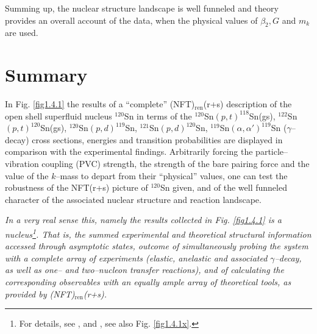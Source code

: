   
  Summing up, the nuclear structure landscape is well funneled and  theory provides an overall account of the data, when the physical values of $\beta_2,G$ and $m_k$ are used.

\section{Summary}\label{C1S11}
In Fig. \ref{fig1.4.1} the results of a ``complete'' (NFT)$_{\text{ren}}$(r+s) description of the open shell superfluid nucleus $^{120}$Sn in terms of the $^{120}$Sn$(p,t)^{118}$Sn(gs), $^{122}$Sn$(p,t)^{120}$Sn(gs), $^{120}$Sn$(p,d)^{119}$Sn, $^{121}$Sn$(p,d)^{120}$Sn, $^{119}$Sn$(\alpha,\alpha')^{119}$Sn ($\gamma$--decay) cross sections, energies and transition probabilities are displayed in comparison with the experimental findings. 
Arbitrarily forcing the particle--vibration coupling (PVC) strength, the strength of the bare pairing force and the value of the $k$--mass to depart from their ``physical'' values, one can test the robustness  of the NFT(r+s) picture of $^{120}$Sn given, and of the well funneled character of the associated nuclear structure and reaction landscape. 










 
\textit{
In a very real sense this, namely the results collected in Fig. \ref{fig1.4.1} is a nucleus\footnote{For details, see \cite{Idini:15}, and \cite{Broglia:16}, see also  Fig. \ref{fig1.4.1x}.}. That is, the summed experimental and theoretical structural information accessed through asymptotic states, outcome of simultaneously  probing the system with a complete array of experiments (elastic, anelastic and associated $\gamma$--decay, as well as one-- and two--nucleon transfer reactions), and of calculating the corresponding observables with an equally ample array of theoretical tools, as provided by (NFT)$_{\text{ren}}$(r+s).}

